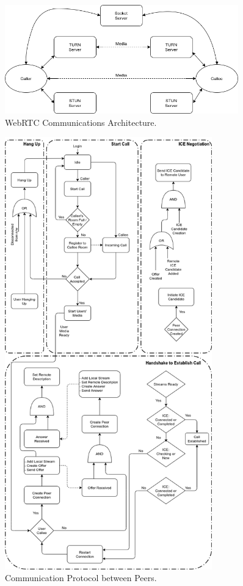 \begin{figure}[h!]
    \caption{WebRTC Communications Architecture.}
    \label{image:webRTCCommsArch}
    \centering
    \includegraphics[width=0.9\textwidth]{images/WebRTCCommsArchitecture.png}
\end{figure}

\begin{figure}[h!]
    \caption{Communication Protocol between Peers.}
    \label{image:commsProtocol}
    \centering
    \includegraphics[width=0.8\textwidth]{images/CommunicationProtocol.png}
\end{figure}

